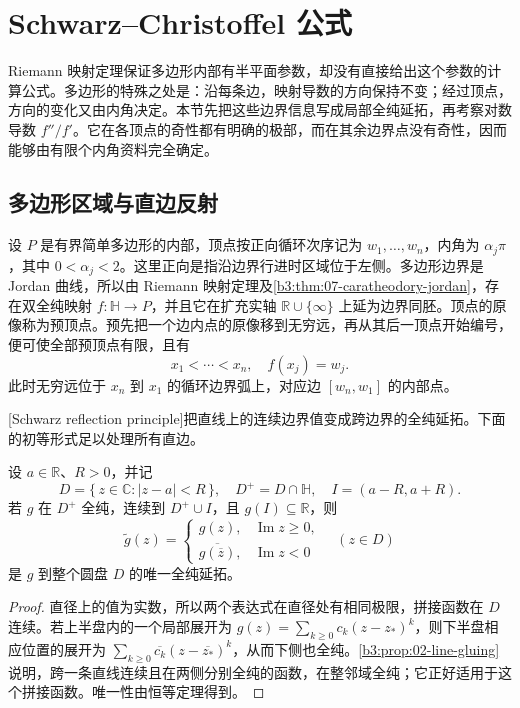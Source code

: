 \section{Schwarz–Christoffel 公式}
\label{b3:sec:0703}

Riemann 映射定理保证多边形内部有半平面参数，却没有直接给出这个参数的计算公式。多边形的特殊之处是：沿每条边，映射导数的方向保持不变；经过顶点，方向的变化又由内角决定。本节先把这些边界信息写成局部全纯延拓，再考察对数导数 \(f''/f'\)。它在各顶点的奇性都有明确的极部，而在其余边界点没有奇性，因而能够由有限个内角资料完全确定。

\subsection{多边形区域与直边反射}
\label{b3:subsec:070301}

设 \(P\) 是有界简单多边形的内部，顶点按正向循环次序记为 \(w_1,\ldots,w_n\)，内角为 \(\alpha_j\pi\)，其中 \(0<\alpha_j<2\)。这里正向是指沿边界行进时区域位于左侧。多边形边界是 Jordan 曲线，所以由 Riemann 映射定理及\cref{b3:thm:07-caratheodory-jordan}，存在双全纯映射 \(f:\mathbb H\rightarrow P\)，并且它在扩充实轴 \(\mathbb R\cup\{\infty\}\) 上延为边界同胚。顶点的原像称为预顶点。预先把一个边内点的原像移到无穷远，再从其后一顶点开始编号，便可使全部预顶点有限，且有
\[
 x_1<\cdots<x_n,\quad f(x_j)=w_j.
\]
此时无穷远位于 \(x_n\) 到 \(x_1\) 的循环边界弧上，对应边 \([w_n,w_1]\) 的内部点。

\ProseParagraphBreak
{}[Schwarz reflection principle]把直线上的连续边界值变成跨边界的全纯延拓。下面的初等形式足以处理所有直边。

\begin{proposition}[直边反射]\label{b3:prop:07-schwarz-reflection}
设 \(a\in\mathbb R\)、\(R>0\)，并记
\[
 D=\{\,z\in\mathbb C:|z-a|<R\,\},\quad
 D^+=D\cap\mathbb H,\quad I=(a-R,a+R).
\]
若 \(g\) 在 \(D^+\) 全纯，连续到 \(D^+\cup I\)，且 \(g(I)\subseteq\mathbb R\)，则
\[
 \widetilde g(z)=
 \begin{cases}
 g(z),&\operatorname{Im}z\ge0,\\
 \overline{g(\overline z)},&\operatorname{Im}z<0
 \end{cases}
 \quad (z\in D)
\]
是 \(g\) 到整个圆盘 \(D\) 的唯一全纯延拓。
\end{proposition}
\begin{proof}
直径上的值为实数，所以两个表达式在直径处有相同极限，拼接函数在 \(D\) 连续。若上半盘内的一个局部展开为 \(g(z)=\sum_{k\ge0}c_k(z-z_*)^k\)，则下半盘相应位置的展开为 \(\sum_{k\ge0}\overline{c_k}(z-\overline{z_*})^k\)，从而下侧也全纯。\cref{b3:prop:02-line-gluing}说明，跨一条直线连续且在两侧分别全纯的函数，在整邻域全纯；它正好适用于这个拼接函数。唯一性由恒等定理得到。
\end{proof}

